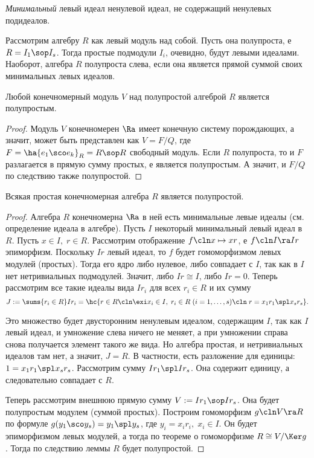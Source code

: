 \documentclass[a4paper]{article}
\begin{document}
\begin{df}
\emph{Минимальный} левый идеал ненулевой идеал, не содержащий ненулевых подидеалов.
\end{df}

Рассмотрим алгебру $R$ как левый модуль над собой. Пусть она полупроста, е $R= I_1 \sop I_s$. Тогда
простые подмодули $I_i$, очевидно, будут левыми идеалами. Наоборот, алгебра $R$ полупроста слева, если
она является прямой суммой своих минимальных левых идеалов.

\begin{stm}
Любой конечномерный модуль $V$ над полупростой алгеброй $R$ является полупростым.
\end{stm}
\begin{proof}
Модуль $V$ конечномерен $\Ra$ имеет конечную систему порождающих, а значит, может быть представлен как
$V=F/Q$, где $F=\ha{e_1 \sco e_k}_R = R \sop R$ свободный модуль. Если $R$ полупроста, то и $F$
разлагается в прямую сумму простых, е является полупростым. А значит, и $F/Q$ по следствию
также полупростой.
\end{proof}

\begin{stm}
Всякая простая конечномерная алгебра $R$ является полупростой.
\end{stm}
\begin{proof}
Алгебра $R$ конечномерна $\Ra$ в ней есть минимальные левые идеалы (см. определение идеала в алгебре).  Пусть
$I$ некоторый минимальный левый идеал в $R$. Пусть $x \in I, \; r \in R$. Рассмотрим отображение $f\cln x
\mapsto xr$, е $f\cln I \ra Ir$ эпиморфизм. Поскольку $Ir$ левый идеал, то $f$ будет гомоморфизмом
левых модулей (простых). Тогда его ядро либо нулевое, либо совпадает с $I$, так как в $I$ нет нетривиальных
подмодулей. Значит, либо $Ir \cong I$, либо $Ir=0$. Теперь рассмотрим все такие идеалы вида $Ir_i$ для всех
$r_i \in R$ и их сумму
$$J:=\sums{r_i \in R} I r_i = \hc{r \in R\cln \exi x_i \in I, \; r_i \in R \; (i=1,\ldots,s)\cln \; r = x_1 r_1  \spl  x_s r_s}.$$

Это множество будет двусторонним ненулевым идеалом, содержащим $I$, так как $I$ левый идеал, и  умножение
слева ничего не меняет, а при умножении справа снова получается элемент такого же вида. Но алгебра простая, и
нетривиальных идеалов там нет, а значит, $J=R$. В частности, есть разложение для единицы: $1=x_1 r_1  \spl
x_s r_s$. Рассмотрим сумму $Ir_1  \spl  Ir_s$. Она содержит единицу, а следовательно совпадает с $R$.

Теперь рассмотрим внешнюю прямую сумму $V := I r_1 \sop I r_s$. Она будет полупростым модулем (суммой простых).
Построим гомоморфизм $g\cln V \ra R$ по формуле $g(y_1 \sco y_s)=y_1  \spl y_s$, где $y_i = x_i r_i, \; x_i \in I$.
Он будет эпиморфизмом левых модулей, а тогда по теореме о гомоморфизме $R \cong V/\Ker g$. Тогда по следствию
леммы $R$ будет полупростой.
\end{proof}
\end{document}
